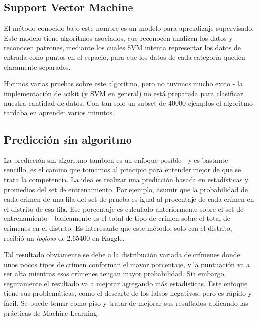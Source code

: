 \subsection{Support Vector Machine} %
\label{sub:support_vector_machine}

El método conocido bajo este nombre es un modelo para aprendizaje supervisado. Este modelo tiene algoritmos asociados, que reconocen analizan los datos y reconocen patrones, mediante los cuales SVM intenta representar los datos de entrada cono puntos en el espacio, para que los datos de cada categoría queden claramente separados.

Hicimos varias pruebas sobre este algoritmo, pero no tuvimos mucho exito - la implementación de scikit (y SVM en general) no está preparada para clasificar nuestra cantidad de datos. Con tan solo un subset de 40000 ejemplos el algoritmo tardaba en aprender varios minutos.


\subsection{Predicción sin algoritmo} %
\label{sub:prediccion_sin_algoritmo}

La predicción sin algoritmo tambien es un enfoque posible - y es bastante sencillo, es el camino que tomamos al principio para entender mejor de que se trata la competencia. La idea es realizar una predicción basada en estadísticas y promedios del set de entrenamiento. Por ejemplo, asumir que la probabilidad de cada crimen de una fila del set de prueba es igual al procentaje de cada crímen en el distrito de esa fila. Ese porcentaje es calculado anteriormente sobre el set de entrenamiento - basicamente es el total de tipo de crímen sobre el total de crimenes en el distrito. Es interesante que este método, solo con el distrito, recibió un \textit{logloss} de 2.65400 en Kaggle.

Tal resultado obviamente se debe a la distribución variada de crímenes donde unos pocos tipos de crímen conforman el mayor porcentaje, y la puntuación va a ser alta mientras esos crímenes tengan mayor probabilidad. Sin embargo, seguramente el resultado va a mejorar agregando más estadísticas. Este enfoque tiene sus problemáticas, como el descarte de los falsos negativos, pero es rápido y fácil. Se puede tomar como piso y tratar de mejorar sus resultados aplicando las prácticas de Machine Learning.



